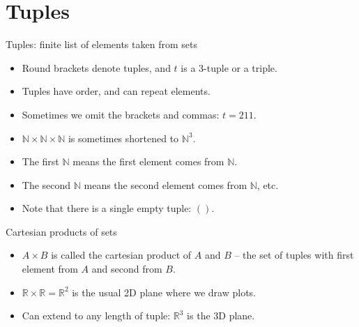 \section{Tuples}

\begin{frame}{Tuples: finite list of elements taken from sets}
  \begin{itemize}
    \setlength\itemsep{2mm}
    \item Round brackets denote tuples, and $t$ is a $3$-tuple or a triple.
    \item Tuples have order, and can repeat elements.
    \item Sometimes we omit the brackets and commas: $t = 211$.
    \item $\mathbb{N} \times \mathbb{N} \times \mathbb{N}$ is sometimes shortened to $\mathbb{N}^3$.
    \item The first $\mathbb{N}$ means the first element comes from $\mathbb{N}$.
    \item The second $\mathbb{N}$ means the second element comes from $\mathbb{N}$, etc.
    \item Note that there is a single empty tuple: $()$.
  \end{itemize}
\end{frame}

\begin{frame}[fragile]{Cartesian products of sets}
  
  \begin{itemize}
    \item $A \times B$ is called the cartesian product of $A$ and $B$ -- the set of tuples with first element from $A$ and second from $B$.
    \item $\mathbb{R} \times \mathbb{R} = \mathbb{R}^2$ is the usual 2D plane where we draw plots.
    \item Can extend to any length of tuple: $\mathbb{R}^3$ is the 3D plane.
  \end{itemize}

  \begin{center}
    \hspace{5mm}
  \end{center}
\end{frame}

